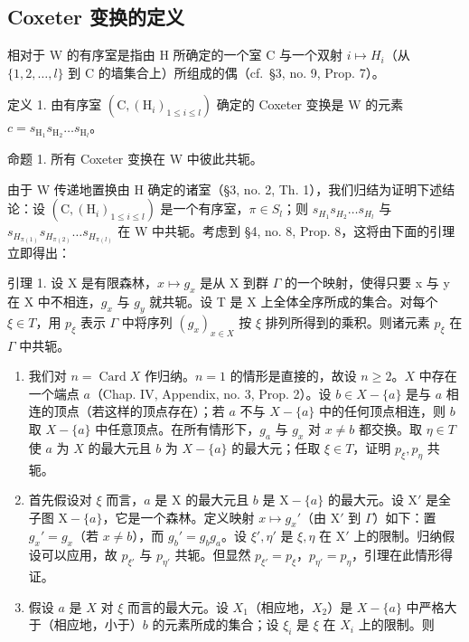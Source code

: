 \subsection{Coxeter 变换的定义}

相对于 W 的有序室是指由 H 所确定的一个室 C 与一个双射 \(i \mapsto H_{i}\)（从 \(\{1, 2, \ldots, l\}\) 到 C 的墙集合上）所组成的偶（cf.~§3, no. 9, Prop. 7）。

定义 1. 由有序室 \((\mathrm{C},(\mathrm{H}_i)_{1\leqslant i\leqslant l})\) 确定的 Coxeter 变换是 W 的元素 \(c = s_{\mathrm{H}_1}s_{\mathrm{H}_2}\dots s_{\mathrm{H}_l}\)。

命题 1. 所有 Coxeter 变换在 W 中彼此共轭。

由于 W 传递地置换由 H 确定的诸室（§3, no. 2, Th. 1），我们归结为证明下述结论：设 \((\mathrm{C},(\mathrm{H}_{i})_{1\leqslant i\leqslant l})\) 是一个有序室，\(\pi\in S_{l}\)；则 \(s_{H_{1}}s_{H_{2}}\ldots s_{H_{l}}\) 与 \(s_{H_{\pi(1)}}s_{H_{\pi(2)}}\ldots s_{H_{\pi(l)}}\) 在 W 中共轭。考虑到 §4, no. 8, Prop. 8，这将由下面的引理立即得出：

引理 1. 设 X 是有限森林，\(x \mapsto g_{x}\) 是从 X 到群 \(\Gamma\) 的一个映射，使得只要 x 与 y 在 X 中不相连，\(g_{x}\) 与 \(g_{y}\) 就共轭。设 T 是 X 上全体全序所成的集合。对每个 \(\xi \in T\)，用 \(p_{\xi}\) 表示 \(\Gamma\) 中将序列 \((g_{x})_{x \in X}\) 按 \(\xi\) 排列所得到的乘积。则诸元素 \(p_{\xi}\) 在 \(\Gamma\) 中共轭。

\begin{enumerate}
\def\labelenumi{\arabic{enumi})}
\item
  我们对 \(n = \operatorname{Card} X\) 作归纳。\(n = 1\) 的情形是直接的，故设 \(n \geqslant 2\)。\(X\) 中存在一个端点 \(a\)（Chap. IV, Appendix, no. 3, Prop. 2）。设 \(b \in X - \{a\}\) 是与 \(a\) 相连的顶点（若这样的顶点存在）；若 \(a\) 不与 \(X - \{a\}\) 中的任何顶点相连，则 \(b\) 取 \(X - \{a\}\) 中任意顶点。在所有情形下，\(g_a\) 与 \(g_x\) 对 \(x \neq b\) 都交换。取 \(\eta \in T\) 使 \(a\) 为 \(X\) 的最大元且 \(b\) 为 \(X - \{a\}\) 的最大元；任取 \(\xi \in T\)，证明 \(p_\xi, p_\eta\) 共轭。
\item
  首先假设对 \(\xi\) 而言，\(a\) 是 X 的最大元且 \(b\) 是 \(\mathrm{X} - \{a\}\) 的最大元。设 \(\mathrm{X}'\) 是全子图 \(\mathrm{X} - \{a\}\)，它是一个森林。定义映射 \(x \mapsto g_x'\)（由 \(\mathrm{X}'\) 到 \(\Gamma\)）如下：置 \(g_x' = g_x\)（若 \(x \neq b\)），而 \(g_b' = g_b g_a\)。设 \(\xi', \eta'\) 是 \(\xi, \eta\) 在 \(\mathrm{X}'\) 上的限制。归纳假设可以应用，故 \(p_{\xi'}\) 与 \(p_{\eta'}\) 共轭。但显然 \(p_{\xi'} = p_{\xi}\)，\(p_{\eta'} = p_{\eta}\)，引理在此情形得证。
\item
  假设 \(a\) 是 \(X\) 对 \(\xi\) 而言的最大元。设 \(X_1\)（相应地，\(X_2\)）是 \(X - \{a\}\) 中严格大于（相应地，小于）\(b\) 的元素所成的集合；设 \(\xi_i\) 是 \(\xi\) 在 \(X_i\) 上的限制。则
\end{enumerate}

